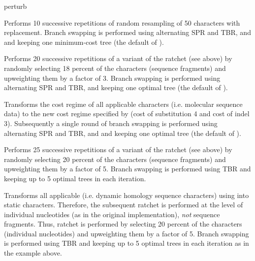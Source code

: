 \begin{command}{perturb}{}
\begin{poyexamples}

{Performs 10 successive repetitions of random resampling of 50
characters with replacement. Branch swapping is performed
using alternating SPR and TBR, and and keeping one minimum-cost tree
(the default of ).}

{Performs 20 successive repetitions of a variant of the ratchet (see
above) by randomly selecting 18 percent of the characters (sequence
fragments) and upweighting them by a factor of 3. Branch swapping is
performed using alternating SPR and TBR, and keeping one
optimal tree (the default of ).}

{Transforms the cost regime of all applicable characters (i.e.
molecular sequence data) to the new cost regime specified by
 (cost of substitution 4 and cost of indel 3).
Subsequently a single round of branch swapping is
performed using alternating SPR and TBR, and and keeping one
optimal tree (the default of ).}

{Performs 25 successive repetitions of a variant of the ratchet (see
above) by randomly selecting 20 percent of the characters (sequence
fragments) and upweighting them by a factor of 5. Branch swapping is
performed using TBR and keeping up to 5 optimal trees in each iteration.}

{Transforms all applicable (i.e. dynamic homology sequence
characters) using  into static characters.
Therefore, the subsequent ratchet is performed at the level of
individual nucleotides (as in the original implementation),
\emph{not} sequence fragments. Thus, ratchet is performed by
selecting 20 percent of the characters (individual nucleotides) and
upweighting them by a factor of 5. Branch swapping is performed
using TBR and keeping up to 5 optimal trees in each iteration as in
the example above.}

\end{poyexamples}

\begin{poyalso}
\end{poyalso}

\end{command}

